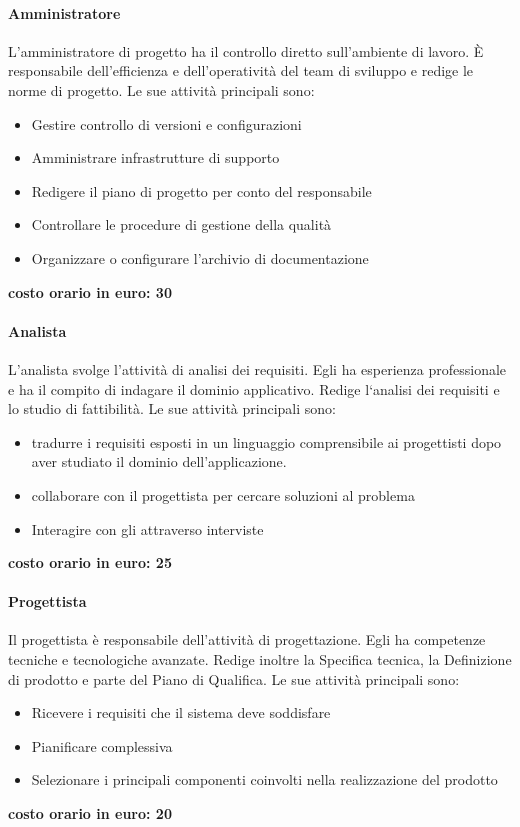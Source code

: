 \documentclass[../norme-di-progetto.tex]{subfiles}
\begin{document}
\paragraph{Amministratore}
L'amministratore di progetto ha il controllo diretto sull'ambiente di lavoro. È responsabile dell'efficienza e dell'operatività del team di sviluppo e redige le norme di progetto. Le sue attività principali sono:
\begin{itemize}
	\item Gestire controllo di versioni e configurazioni
	\item Amministrare infrastrutture di supporto
	\item Redigere il piano di progetto per conto del responsabile
	\item Controllare le procedure di gestione della qualità
	\item Organizzare o configurare l'archivio di documentazione
\end{itemize}
\textbf{costo orario in euro: 30}
\paragraph{Analista}
L'analista svolge l'attività di analisi dei requisiti. Egli ha esperienza professionale e ha il compito di indagare il dominio applicativo. Redige l`analisi dei requisiti e lo studio di fattibilità. Le sue attività principali sono:
\begin{itemize}
	\item tradurre i requisiti esposti in un linguaggio comprensibile ai progettisti dopo aver studiato il dominio dell'applicazione.
	\item collaborare con il progettista per cercare soluzioni al problema
	\item Interagire con gli  attraverso interviste
\end{itemize}
\textbf{costo orario in euro: 25}
\paragraph{Progettista}
Il progettista è responsabile dell'attività di progettazione. Egli ha competenze tecniche e tecnologiche avanzate. Redige inoltre la Specifica tecnica, la Definizione di prodotto e parte del Piano di Qualifica. Le sue attività principali sono:
\begin{itemize}
	\item Ricevere i requisiti che il sistema deve soddisfare
	\item Pianificare  complessiva
	\item Selezionare i principali componenti coinvolti nella realizzazione del prodotto
\end{itemize}
\textbf{costo orario in euro: 20}
\end{document}
